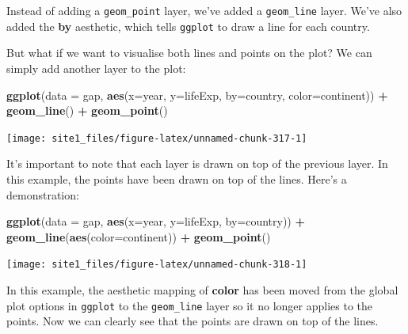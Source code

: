 \documentclass[]{book}
\newenvironment{Shaded}{\begin{snugshade}}{\end{snugshade}}
\newcommand{\KeywordTok}[1]{\textcolor[rgb]{0.13,0.29,0.53}{\textbf{#1}}}
\newcommand{\DataTypeTok}[1]{\textcolor[rgb]{0.13,0.29,0.53}{#1}}
\newcommand{\StringTok}[1]{\textcolor[rgb]{0.31,0.60,0.02}{#1}}
\newcommand{\OperatorTok}[1]{\textcolor[rgb]{0.81,0.36,0.00}{\textbf{#1}}}
\newcommand{\NormalTok}[1]{#1}
\begin{document}
Instead of adding a \texttt{geom\_point} layer, we've added a
\texttt{geom\_line} layer. We've also added the \textbf{by} aesthetic,
which tells \texttt{ggplot} to draw a line for each country.

But what if we want to visualise both lines and points on the plot? We
can simply add another layer to the plot:

\begin{Shaded}
\begin{Highlighting}[]
\KeywordTok{ggplot}\NormalTok{(}\DataTypeTok{data =}\NormalTok{ gap, }\KeywordTok{aes}\NormalTok{(}\DataTypeTok{x=}\NormalTok{year, }\DataTypeTok{y=}\NormalTok{lifeExp, }\DataTypeTok{by=}\NormalTok{country, }\DataTypeTok{color=}\NormalTok{continent)) }\OperatorTok{+}\StringTok{ }
\StringTok{  }\KeywordTok{geom_line}\NormalTok{() }\OperatorTok{+}\StringTok{ }
\StringTok{  }\KeywordTok{geom_point}\NormalTok{()}
\end{Highlighting}
\end{Shaded}

\begin{center}\texttt{[image: site1\_files/figure-latex/unnamed-chunk-317-1]} \end{center}

It's important to note that each layer is drawn on top of the previous
layer. In this example, the points have been drawn on top of the lines.
Here's a demonstration:

\begin{Shaded}
\begin{Highlighting}[]
\KeywordTok{ggplot}\NormalTok{(}\DataTypeTok{data =}\NormalTok{ gap, }\KeywordTok{aes}\NormalTok{(}\DataTypeTok{x=}\NormalTok{year, }\DataTypeTok{y=}\NormalTok{lifeExp, }\DataTypeTok{by=}\NormalTok{country)) }\OperatorTok{+}\StringTok{ }
\StringTok{  }\KeywordTok{geom_line}\NormalTok{(}\KeywordTok{aes}\NormalTok{(}\DataTypeTok{color=}\NormalTok{continent)) }\OperatorTok{+}\StringTok{ }
\StringTok{  }\KeywordTok{geom_point}\NormalTok{()}
\end{Highlighting}
\end{Shaded}

\begin{center}\texttt{[image: site1\_files/figure-latex/unnamed-chunk-318-1]} \end{center}

In this example, the aesthetic mapping of \textbf{color} has been moved
from the global plot options in \texttt{ggplot} to the
\texttt{geom\_line} layer so it no longer applies to the points. Now we
can clearly see that the points are drawn on top of the lines.
\end{document}
